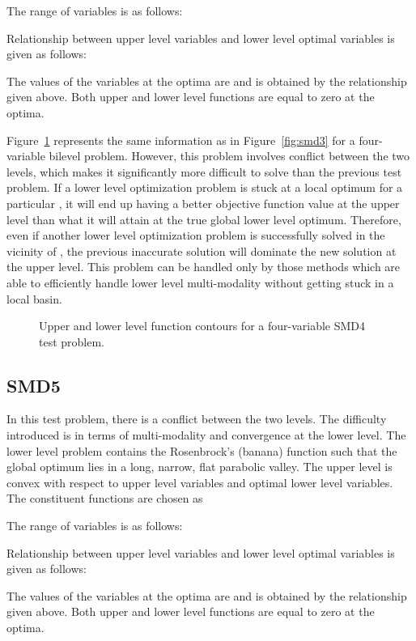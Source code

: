 \documentclass[twoside]{article}
\begin{document}
The range of variables is as follows:

Relationship between upper level variables and lower level optimal variables is given as follows:

The values of the variables at the optima are  and  is obtained by the relationship given above. Both upper and
lower level functions are equal to zero at the optima.

Figure~\ref{fig:smd4} represents the same information as in Figure~\ref{fig:smd3} for a four-variable bilevel problem. However, this problem involves conflict between the two levels, which makes it significantly more difficult to solve than the previous test problem. If a lower level optimization problem is stuck at a local optimum for a particular , it will end up having a better objective function value at the upper level than what it will attain at the true global lower level optimum. Therefore, even if another lower level optimization problem is successfully solved in the vicinity of , the previous inaccurate solution will dominate the new solution at the upper level. This problem can be handled only by those methods which are able to efficiently handle lower level multi-modality without getting stuck in a local basin.

\begin{figure}
\begin{center}
\caption{Upper and lower level function contours for a four-variable SMD4 test problem.}
\label{fig:smd4}
\end{center}
\end{figure}

\subsection{SMD5}
In this test problem, there is a conflict between the two levels. The difficulty introduced is in terms of multi-modality and convergence at the lower level. The lower level problem contains the Rosenbrock's (banana) function such that the global optimum lies in a long, narrow, flat parabolic valley. 
The upper level is convex with respect to upper level variables and optimal lower level variables. The constituent functions are chosen as

The range of variables is as follows:

Relationship between upper level variables and lower level optimal variables is given as follows:

The values of the variables at the optima are  and  is obtained by the relationship given above. Both upper and
lower level functions are equal to zero at the optima.
\end{document}
